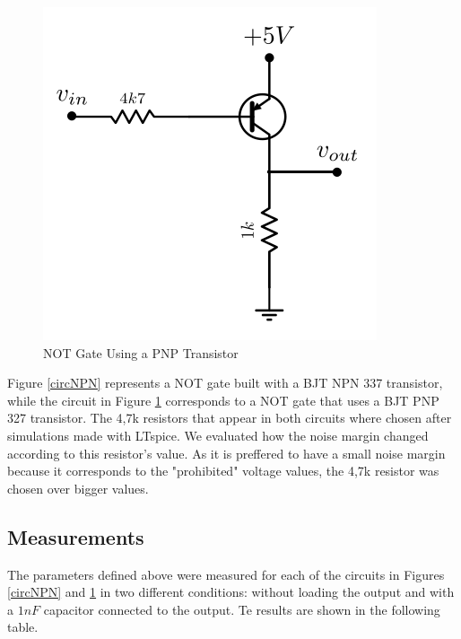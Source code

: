\documentclass[a4paper,11pt]{report}
\begin{document}
\begin{figure}[h!]
\centering
\includegraphics[scale=1]{../Exercise1/circuitoPNP}
\caption{NOT Gate Using a PNP Transistor}
\label{circPNP}
\end{figure}

Figure \ref{circNPN} represents a NOT gate built with a BJT NPN 337 transistor, while the circuit in Figure \ref{circPNP} corresponds to a NOT gate that uses a BJT PNP 327 transistor. The 4,7k{\textOmega} resistors that appear in both circuits where chosen after simulations made with LTspice. We evaluated how the noise margin changed according to this resistor's value. As it is preffered to have a small noise margin because it corresponds to the "prohibited" voltage values, the 4,7k{\textOmega} resistor was chosen over bigger values.




\subsection{\color{purple}Measurements}

The parameters defined above were measured for each of the circuits in Figures \ref{circNPN} and \ref{circPNP} in two different conditions: without loading the output and with a $1 nF$ capacitor connected to the output. Te results are shown in the following table. \\
\end{document}
